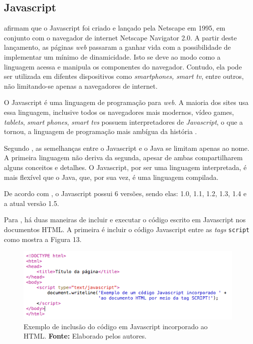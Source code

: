 \subsection{Javascript}

 afirmam que o Javascript foi criado e lançado pela Netscape em 1995, em conjunto com o navegador de internet Netscape Navigator 2.0. A partir deste lançamento, as páginas \textit{web} passaram a ganhar vida com a possibilidade de implementar um mínimo de dinamicidade. Isto se deve ao modo como a linguagem acessa e manipula os componentes do navegador. Contudo, ela pode ser utilizada em difentes dispositivos como \textit{smartphones, smart tv}, entre outros, não limitando-se apenas a navegadores de internet.

O Javascript é uma linguagem de programação para \textit{web}. A maioria dos sites usa essa linguagem, inclusive todos os navegadores mais modernos, vídeo games, \textit{tablets}, \textit{smart phones}, \textit{smart tvs} possuem interpretadores de \textit{Javascript}, o que a tornou, a linguagem de programação mais ambígua da história \cite{flanagan_javascript_definitive_guide}.

Segundo , as semelhanças entre o Javascript e o Java se limitam apenas ao nome. A primeira linguagem não deriva da segunda, apesar de ambas compartilharem alguns conceitos e detalhes. O Javascript, por ser uma linguagem interpretada, é mais flexível que o Java, que, por sua vez, é uma linguagem compilada.

De acordo com , o Javascript possui 6 versões, sendo elas: 1.0, 1.1, 1.2, 1.3, 1.4 e a atual versão 1.5.

Para , há duas maneiras de incluir e executar o código escrito em Javascript nos documentos HTML. A primeira é incluir o código Javascript entre as \textit{tags} \texttt{script} como mostra a Figura 13. 

\begin{figure}[h!]
	\centerline{\includegraphics[scale=0.8]{./imagens/javascript_code.png}}
	\caption[Exemplo de inclusão do código em Javascript incorporado ao HTML]
	{Exemplo de inclusão do código em Javascript incorporado ao HTML. \textbf{Fonte:} Elaborado pelos autores.}
	\label{fig:exemplo1}
\end{figure}

